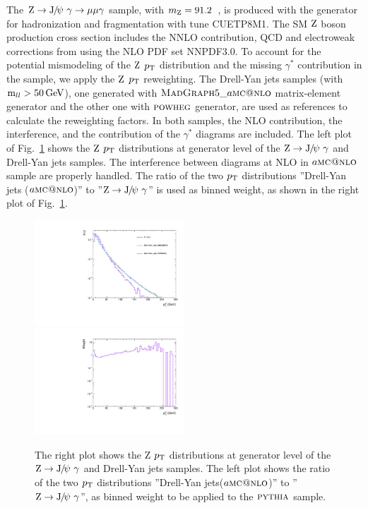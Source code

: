 		The $\cPZ\to\JPsi\ \gamma\to\mu\mu\gamma$ sample, with $m_{\mathrm{Z}}=91.2$\GeV~\cite{Patrignani:2241948}, is produced with the  generator for hadronization and fragmentation with tune CUETP8M1.
The SM $\mathrm{Z}$ boson production cross section includes the NNLO contribution, QCD and electroweak corrections from  using the NLO PDF set NNPDF3.0.
		To account for the potential mismodeling of the $\mathrm{Z}$ $p_{\mathrm{T}}$ distribution and the missing $\gamma^{*}$ contribution in the sample, we apply the $\mathrm{Z}$ $p_{\mathrm{T}}$ reweighting. 
		The Drell-Yan jets samples (with $\text{m}_{ll} > 50\,\text{Ge\hspace{-.08em}V}$), one generated with $\textsc{MadGraph}{}5\_a\textsc{mc@nlo}$ matrix-element generator and the other one with ${\textsc{powheg}}$ generator,  are used as references to calculate the reweighting factors. In both samples, the NLO contribution, the interference, and the contribution of the $\gamma^{*}$ diagrams are included. 
		The left plot of Fig.~\ref{fig:ZPtRewei} shows the $\mathrm{Z}$ $p_{\mathrm{T}}$ distributions at generator level of the $\mathrm{Z}\to{\mathrm{J}\hspace{-.08em}/\hspace{-.14em}\psi}\ \gamma$ and Drell-Yan jets samples. The interference between diagrams at NLO in $a\textsc{mc@nlo}$ sample are properly handled.  
		The ratio of the two $p_{\mathrm{T}}$ distributions ''Drell-Yan jets ($a\textsc{mc@nlo}$)'' to ''$\mathrm{Z}\to{\mathrm{J}\hspace{-.08em}/\hspace{-.14em}\psi}\ \gamma$'' is used as binned weight, as shown in the right plot of Fig.~\ref{fig:ZPtRewei}.
		\begin{figure}[!ht]
		  \begin{center}
		  \includegraphics[width=0.5\textwidth]{Fig/ZPt_comp_withgenwei_final}~
		  \includegraphics[width=0.5\textwidth]{Fig/ZPt_ratio_withgenwei_final}\\
		  \caption{The right plot shows the Z $p_{\mathrm{T}}$ distributions at generator level of the $\mathrm{Z}\to{\mathrm{J}\hspace{-.08em}/\hspace{-.14em}\psi}\ \gamma$ and Drell-Yan jets samples. The left plot shows the ratio of the two $p_{\mathrm{T}}$ distributions ''Drell-Yan jets($a\textsc{mc@nlo}$)'' to ''$\mathrm{Z}\to{\mathrm{J}\hspace{-.08em}/\hspace{-.14em}\psi}\ \gamma$'', as binned weight to be applied to the ${\textsc{pythia}}$ sample. \label{fig:ZPtRewei}}
		  \end{center}
		\end{figure}
		
